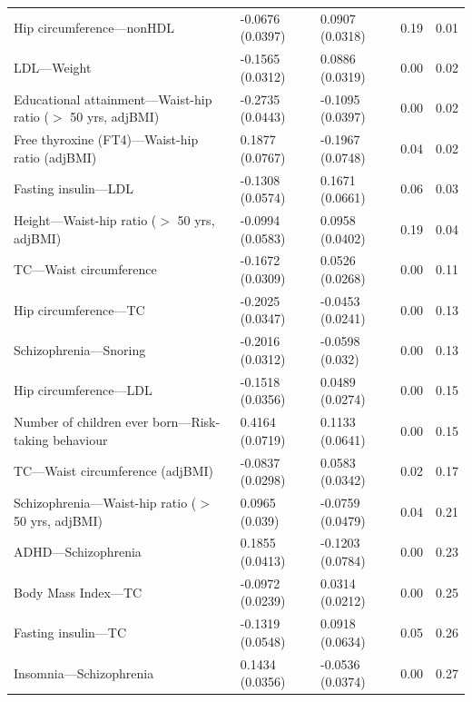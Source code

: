 \begin{table}[ht]
\begin{tabular}{lllrr}
  Hip circumference---nonHDL & -0.0676 (0.0397) & 0.0907 (0.0318) & 0.19 & 0.01 \\ 
  LDL---Weight & -0.1565 (0.0312) & 0.0886 (0.0319) & 0.00 & 0.02 \\ 
  Educational attainment---Waist-hip ratio ($>$ 50 yrs, adjBMI) & -0.2735 (0.0443) & -0.1095 (0.0397) & 0.00 & 0.02 \\ 
  Free thyroxine (FT4)---Waist-hip ratio (adjBMI) & 0.1877 (0.0767) & -0.1967 (0.0748) & 0.04 & 0.02 \\ 
  Fasting insulin---LDL & -0.1308 (0.0574) & 0.1671 (0.0661) & 0.06 & 0.03 \\ 
  Height---Waist-hip ratio ($>$ 50 yrs, adjBMI) & -0.0994 (0.0583) & 0.0958 (0.0402) & 0.19 & 0.04 \\ 
  TC---Waist circumference & -0.1672 (0.0309) & 0.0526 (0.0268) & 0.00 & 0.11 \\ 
  Hip circumference---TC & -0.2025 (0.0347) & -0.0453 (0.0241) & 0.00 & 0.13 \\ 
  Schizophrenia---Snoring & -0.2016 (0.0312) & -0.0598 (0.032) & 0.00 & 0.13 \\ 
  Hip circumference---LDL & -0.1518 (0.0356) & 0.0489 (0.0274) & 0.00 & 0.15 \\ 
  Number of children ever born---Risk-taking behaviour & 0.4164 (0.0719) & 0.1133 (0.0641) & 0.00 & 0.15 \\ 
  TC---Waist circumference (adjBMI) & -0.0837 (0.0298) & 0.0583 (0.0342) & 0.02 & 0.17 \\ 
  Schizophrenia---Waist-hip ratio ($>$ 50 yrs, adjBMI) & 0.0965 (0.039) & -0.0759 (0.0479) & 0.04 & 0.21 \\ 
  ADHD---Schizophrenia & 0.1855 (0.0413) & -0.1203 (0.0784) & 0.00 & 0.23 \\ 
  Body Mass Index---TC & -0.0972 (0.0239) & 0.0314 (0.0212) & 0.00 & 0.25 \\ 
  Fasting insulin---TC & -0.1319 (0.0548) & 0.0918 (0.0634) & 0.05 & 0.26 \\ 
  Insomnia---Schizophrenia & 0.1434 (0.0356) & -0.0536 (0.0374) & 0.00 & 0.27 \\ 
   \hline
\end{tabular}
\end{table}


